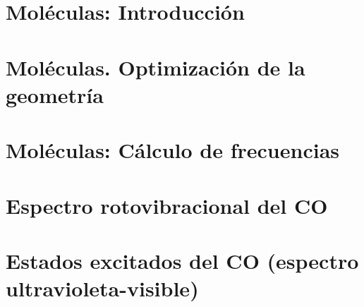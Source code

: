 \documentclass{tufte-book}
\begin{document}
\chapter{Moléculas: Introducción}

\chapter{Moléculas. Optimización de la geometría}

\chapter{Moléculas: Cálculo de frecuencias}

\chapter{Espectro rotovibracional del CO}

\chapter{Estados excitados del CO (espectro ultravioleta-visible)}



%
%
\end{document}
